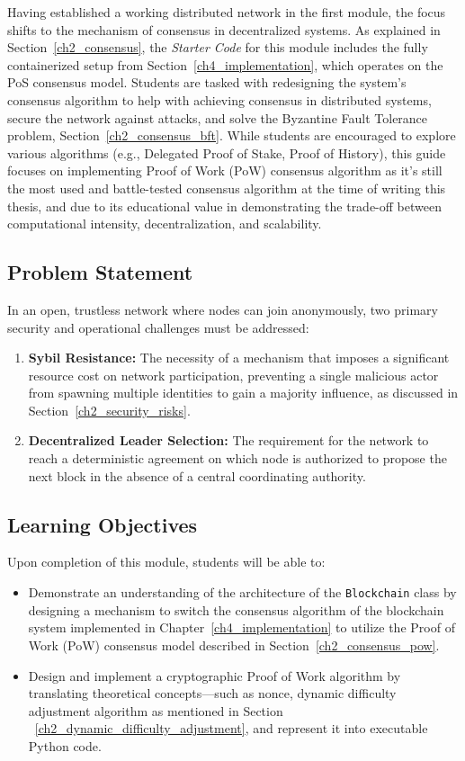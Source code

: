 Having established a working distributed network in the first module, the focus shifts to the mechanism of consensus in decentralized systems. As explained in Section~\ref{ch2_consensus}, the \textit{Starter Code} for this module includes the fully containerized setup from Section~\ref{ch4_implementation}, which operates on the PoS consensus model. Students are tasked with redesigning the system's consensus algorithm to help with achieving consensus in distributed systems, secure the network against attacks, and solve the Byzantine Fault Tolerance problem, Section~\ref{ch2_consensus_bft}. While students are encouraged to explore various algorithms (e.g., Delegated Proof of Stake, Proof of History), this guide focuses on implementing Proof of Work (PoW) consensus algorithm as it's still the most used and battle-tested consensus algorithm at the time of writing this thesis, and due to its educational value in demonstrating the trade-off between computational intensity, decentralization, and scalability.

\subsection{Problem Statement}
In an open, trustless network where nodes can join anonymously, two primary security and operational challenges must be addressed:
\begin{enumerate}
    \item \textbf{Sybil Resistance:} The necessity of a mechanism that imposes a significant resource cost on network participation, preventing a single malicious actor from spawning multiple identities to gain a majority influence, as discussed in Section~\ref{ch2_security_risks}.
    \item \textbf{Decentralized Leader Selection:} The requirement for the network to reach a deterministic agreement on which node is authorized to propose the next block in the absence of a central coordinating authority.
\end{enumerate}

\subsection{Learning Objectives}

Upon completion of this module, students will be able to:

\begin{itemize}
    \item Demonstrate an understanding of the architecture of the \texttt{Blockchain} class by designing a mechanism to switch the consensus algorithm of the blockchain system implemented in Chapter~\ref{ch4_implementation} to utilize the Proof of Work (PoW) consensus model described in Section~\ref{ch2_consensus_pow}.
    \item Design and implement a cryptographic Proof of Work algorithm by translating theoretical concepts—such as nonce, dynamic difficulty adjustment algorithm as mentioned in Section ~\ref{ch2_dynamic_difficulty_adjustment}, and represent it into executable Python code.
\end{itemize}

